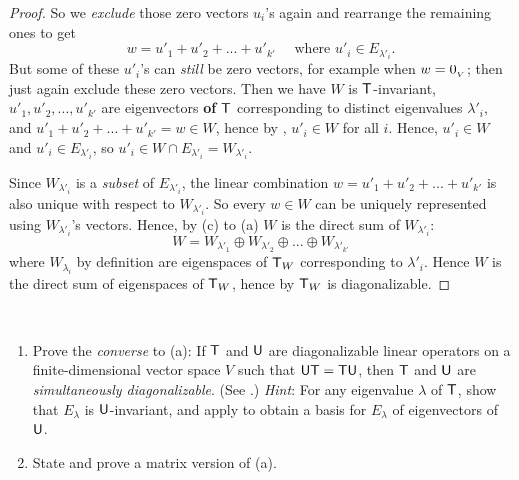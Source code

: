 \begin{proof}
So we \emph{exclude} those zero vectors \(u_i\)'s again and rearrange the remaining ones to get
\[
    w = u'_1 + u'_2 + ... + u'_{k'} \quad \text{ where } u'_i \in E_{\lambda'_i}.
\]
But some of these \(u'_i\)'s can \emph{still} be zero vectors, for example when \(w = 0_{_V}\); then just again exclude these zero vectors.
Then we have \(W\) is \(\textsf{T}\)-invariant, \(u'_1, u'_2, ..., u'_{k'}\) are eigenvectors \textbf{of \(\textsf{T}\)} corresponding to distinct eigenvalues \(\lambda'_i\), and \(u'_1 + u'_2 + ... + u'_{k'} = w \in W\), hence by , \(u'_i \in W\) for all \(i\).
Hence, \(u'_i \in W\) and \(u'_i \in E_{\lambda'_i}\), so \(u'_i \in W \cap E_{\lambda'_i} = W_{\lambda'_i}\).

Since \(W_{\lambda'_i}\) is a \emph{subset} of \(E_{\lambda'_i}\), the linear combination \(w = u'_1 + u'_2 + ... + u'_{k'}\) is also unique with respect to \(W_{\lambda'_i}\).
So every \(w \in W\) can be uniquely represented using \(W_{\lambda'_i}\)'s vectors.
Hence, by (c) to (a) \(W\) is the direct sum of \(W_{\lambda'_i}\):
\[
    W = W_{\lambda'_1} \oplus W_{\lambda'_2} \oplus ... \oplus W_{\lambda'_{k'}}
\]
where \(W_{\lambda_i}\) by definition are eigenspaces of \(\textsf{T}_W\) corresponding to \(\lambda'_i\).
Hence \(W\) is the direct sum of eigenspaces of \(\textsf{T}_W\), hence by  \(\textsf{T}_W\) is diagonalizable.
\end{proof}

\begin{exercise} \label{exercise 5.4.25} \ 

\begin{enumerate}
\item Prove the \emph{converse} to (a): If \(\textsf{T}\) and \(\textsf{U}\) are diagonalizable linear operators on a finite-dimensional vector space \(V\) such that \(\textsf{U}\textsf{T} = \textsf{T}\textsf{U}\), then \(\textsf{T}\) and \(\textsf{U}\) are \emph{simultaneously diagonalizable}.
(See .)
\emph{Hint}: For any eigenvalue \(\lambda\) of \(\textsf{T}\), show that \(E_{\lambda}\) is \(\textsf{U}\)-invariant, and apply  to obtain a basis for \(E_{\lambda}\) of eigenvectors of \(\textsf{U}\).
\item State and prove a matrix version of (a).
\end{enumerate}
\end{exercise}

